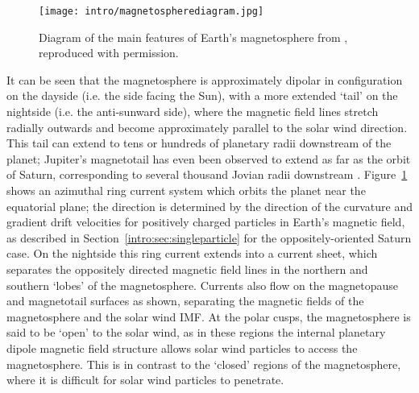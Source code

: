 \begin{figure}
\centering
\noindent\texttt{[image: intro/magnetospherediagram.jpg]}
\caption[Diagram of Earth's magnetosphere.]{Diagram of the main features of Earth's magnetosphere from \citet{russell2016}, reproduced with permission.}
\label{intro:fig:magnetosphere}
\end{figure}

It can be seen that the magnetosphere is approximately dipolar in configuration on the dayside (i.e. the side facing the Sun), with a more extended `tail' on the nightside (i.e. the anti-sunward side), where the magnetic field lines stretch radially outwards and become approximately parallel to the solar wind direction. This tail can extend to tens or hundreds of planetary radii downstream of the planet; Jupiter's magnetotail has even been observed to extend as far as the orbit of Saturn, corresponding to several thousand Jovian radii downstream \citep{scarf1981}. Figure~\ref{intro:fig:magnetosphere} shows an azimuthal ring current system which orbits the planet near the equatorial plane; the direction is determined by the direction of the curvature and gradient drift velocities for positively charged particles in Earth's magnetic field, as described in Section~\ref{intro:sec:singleparticle} for the oppositely-oriented Saturn case. On the nightside this ring current extends into a current sheet, which separates the oppositely directed magnetic field lines in the northern and southern `lobes' of the magnetosphere. Currents also flow on the magnetopause and magnetotail surfaces as shown, separating the magnetic fields of the magnetosphere and the solar wind IMF. At the polar cusps, the magnetosphere is said to be `open' to the solar wind, as in these regions the internal planetary dipole magnetic field structure allows solar wind particles to access the magnetosphere. This is in contrast to the `closed' regions of the magnetosphere, where it is difficult for solar wind particles to penetrate.

